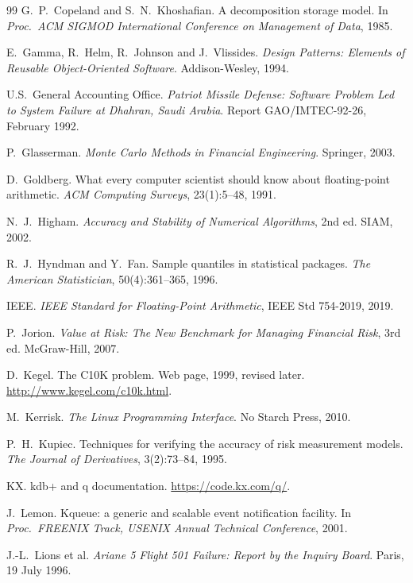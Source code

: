 \begin{thebibliography}{99}
 G.~P.~Copeland and S.~N.~Khoshafian. A decomposition storage model. In \emph{Proc.\ ACM SIGMOD International Conference on Management of Data}, 1985.

 E.~Gamma, R.~Helm, R.~Johnson and J.~Vlissides. \emph{Design Patterns: Elements of Reusable Object-Oriented Software}. Addison-Wesley, 1994.

 U.S.\ General Accounting Office. \emph{Patriot Missile Defense: Software Problem Led to System Failure at Dhahran, Saudi Arabia}. Report GAO/IMTEC-92-26, February 1992.

 P.~Glasserman. \emph{Monte Carlo Methods in Financial Engineering}. Springer, 2003.

 D.~Goldberg. What every computer scientist should know about floating-point arithmetic. \emph{ACM Computing Surveys}, 23(1):5--48, 1991.

 N.~J.~Higham. \emph{Accuracy and Stability of Numerical Algorithms}, 2nd ed. SIAM, 2002.

 R.~J.~Hyndman and Y.~Fan. Sample quantiles in statistical packages. \emph{The American Statistician}, 50(4):361--365, 1996.

 IEEE. \emph{IEEE Standard for Floating-Point Arithmetic}, IEEE Std 754-2019, 2019.

 P.~Jorion. \emph{Value at Risk: The New Benchmark for Managing Financial Risk}, 3rd ed. McGraw-Hill, 2007.

 D.~Kegel. The C10K problem. Web page, 1999, revised later. \url{http://www.kegel.com/c10k.html}.

 M.~Kerrisk. \emph{The Linux Programming Interface}. No Starch Press, 2010.

 P.~H.~Kupiec. Techniques for verifying the accuracy of risk measurement models. \emph{The Journal of Derivatives}, 3(2):73--84, 1995.

 KX. kdb+ and q documentation. \url{https://code.kx.com/q/}.

 J.~Lemon. Kqueue: a generic and scalable event notification facility. In \emph{Proc.\ FREENIX Track, USENIX Annual Technical Conference}, 2001.

 J.-L.~Lions et al. \emph{Ariane 5 Flight 501 Failure: Report by the Inquiry Board}. Paris, 19 July 1996.


\end{thebibliography}
